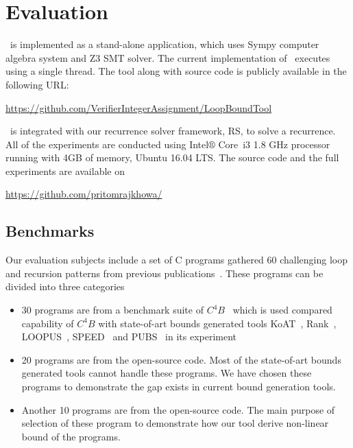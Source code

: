 \section{Evaluation}
\label{sec:evaluation}

\SystemName\ is implemented  as a stand-alone application, which uses Sympy \cite{joyner2012open} computer algebra system  and Z3 \cite{de2008z3} SMT solver.
The current implementation of \SystemName\ executes using a single thread. The tool along with source code is  publicly available  in the following URL:

\url{https://github.com/VerifierIntegerAssignment/LoopBoundTool}

\SystemName\ is integrated with our recurrence solver framework, RS, to solve a recurrence. All of the experiments are conducted using Intel$\circledR$ Core\texttrademark\ i3 1.8 GHz processor running with 4GB of memory, Ubuntu 16.04 LTS. The source code and the full experiments are available on

\url{https://github.com/pritomrajkhowa/}

\subsection{Benchmarks}
 Our evaluation subjects include a set of C programs gathered 60 challenging loop and recursion patterns from previous publications~\cite{Gulwani:2010:RP:1806596.1806630,speed1,Carbonneaux:2015:CCR:2737924.2737955}. These programs can be divided into three categories
\begin{itemize}
	\item 30 programs are from a benchmark suite of $C^4B$~\cite{Carbonneaux:2015:CCR:2737924.2737955} which is used compared capability of $C^4B$ with state-of-art bounds generated tools KoAT~\cite{Brockschmidt:2016:ARS:2982214.2866575}, Rank~\cite{Alias:2010:MRP:1882094.1882102}, LOOPUS~\cite{10.1007/978-3-319-08867-9_50}, SPEED~\cite{speed1} and PUBS~\cite{Albert:2012:CAO:2076807.2077025} in its experiment
	
	\item 20 programs are from the open-source code. Most of the state-of-art bounds generated tools cannot handle these programs. We have chosen these programs to demonstrate the gap exists in current bound generation tools.
	
	\item Another 10 programs are from the open-source code. The main purpose of selection of these program to demonstrate how our tool derive non-linear bound of the programs.  
	

	
	

	
	
\end{itemize}






